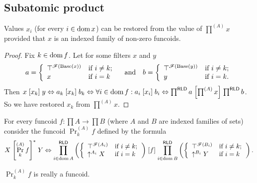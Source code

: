 \subsection{Subatomic product}
\begin{prop}
Values $x_{i}$ (for every $i\in\operatorname{dom} x$) can be restored from the
value of $\prod^{(A)}x$ provided that $x$ is an indexed family of
non-zero funcoids.\end{prop}
\begin{proof}
Fix $k\in\operatorname{dom} f$. Let for some filters $x$ and $y$ 
\[
a=\left\{ \begin{array}{ll}
\top^{\mathscr{F}(\operatorname{Base}(x))} & \text{if }i\neq k;\\
x & \text{if }i=k
\end{array}\right.\quad\text{and}\quad b=\left\{ \begin{array}{ll}
\top^{\mathscr{F}(\operatorname{Base}(y))} & \text{if }i\neq k;\\
y & \text{if }i=k.
\end{array}\right.
\]
Then $x\mathrel{\left[x_{k}\right]}y\Leftrightarrow a_{k}\mathrel{\left[x_{k}\right]}b_{k}\Leftrightarrow\forall i\in\operatorname{dom} f:a_{i}\mathrel{\left[x_{i}\right]}b_{i}\Leftrightarrow\prod^{\mathsf{RLD}}a\mathrel{\left[\prod^{(A)}x\right]}\prod^{\mathsf{RLD}}b$.
So we have restored $x_{k}$ from $\prod^{(A)}x$.\end{proof}
\begin{defn}
For every funcoid $f:\prod A\rightarrow\prod B$ (where $A$ and $B$
are indexed families of sets) consider the funcoid $\Pr_{k}^{(A)}f$
defined by the formula 
\[
X\mathrel{\left[\Pr_{k}^{(A)}f\right]^{\ast}}Y\Leftrightarrow\prod_{i\in\operatorname{dom} A}^{\mathsf{RLD}}\left(\left\{ \begin{array}{ll}
\top^{\mathscr{F}(A_{i})} & \text{if }i\neq k;\\
\uparrow^{A_{i}}X & \text{if }i=k
\end{array}\right.\right)\mathrel{\left[f\right]}\prod_{i\in\operatorname{dom} B}^{\mathsf{RLD}}\left(\left\{ \begin{array}{ll}
\top^{\mathscr{F}(B_{i})} & \text{if }i\neq k;\\
\uparrow^{B_{i}}Y & \text{if }i=k
\end{array}\right.\right).
\]
\end{defn}
\begin{prop}
$\Pr_{k}^{(A)}f$ is really a funcoid.\end{prop}

